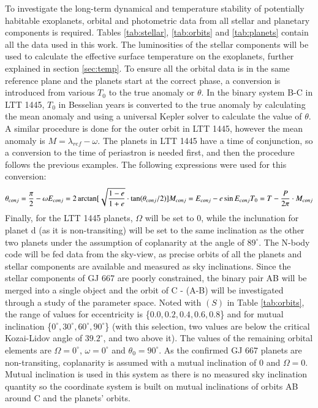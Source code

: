 \documentclass[referee]{aa}
\begin{document}
    To investigate the long-term dynamical and temperature stability of potentially habitable exoplanets, orbital and photometric data from all stellar and planetary components
    is required. Tables \ref{tab:stellar}, \ref{tab:orbits} and \ref{tab:planets} contain
    all the data used in this work. The luminosities of the stellar components will be used to calculate the effective surface temperature
    on the exoplanets, further explained in section \ref{sec:temp}. To ensure all the orbital data is in the same reference plane and the planets start at the correct phase, 
    a conversion is introduced from various $T_0$ to the true anomaly or $\theta$. In the binary system B-C in LTT 1445, $T_0$ in Besselian years is converted to
    the true anomaly by calculating the mean anomaly and using a universal Kepler solver to calculate the value of $\theta$. A similar procedure is done for the outer orbit in LTT 1445,
    however the mean anomaly is $M = \lambda_{ref} - \omega$. The planets in LTT 1445 have a time of conjunction, so a conversion to the time of periastron is needed first, and then
    the procedure follows the previous examples. The following expressions were used for this conversion:
    \begin{equation}
        \theta_{conj} = \frac{\pi}{2} - \omega \\
        E_{conj} = 2\arctan[\sqrt{\frac{1-e}{1+e}} \cdot \tan(\theta_{conj}/2)] \\
        M_{conj} = E_{conj} - e\sin E_{conj} \\
        T_0 = T - \frac{P}{2\pi} \cdot M_{conj}
    \end{equation}
    Finally, for the LTT 1445 planets, $\Omega$ will be set to 0, while the inclunation for planet d (as it is non-transiting) will be set to the same inclination
    as the other two planets under the assumption of coplanarity at the angle of $89^\circ$. The N-body code will be fed data from the sky-view, as precise orbits of all the planets and stellar
    components are available and measured as sky inclinations.
    Since the stellar components of GJ 667 are poorly constrained, the binary pair AB will be merged into a single object and the orbit of C - (A-B) will be investigated through
    a study of the parameter space. Noted with $(S)$ in Table \ref{tab:orbits}, the range of values
    for eccentricity is \{$0.0, 0.2, 0.4, 0.6, 0.8$\} and for mutual inclination \{$0^\circ, 30^\circ, 60^\circ, 90^\circ$\} (with this selection, two values are below the critical
    Kozai-Lidov angle of $39.2^\circ$, and two above it). The values of the remaining orbital elements are $\Omega = 0^\circ$, $\omega = 0^\circ$ and $\theta_0 = 90^\circ$.
    As the confirmed GJ 667 planets are non-transiting, coplanarity is assumed with a mutual inclination of 0 and $\Omega = 0$. Mutual inclination is used in this system as there is no
    measured sky inclination quantity so the coordinate system is built on mutual inclinations of orbits AB around C and the planets' orbits.
\end{document}
